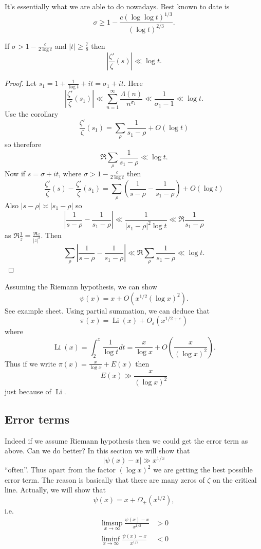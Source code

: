 \documentclass[a4paper]{article}
\theoremstyle{definition}
\begin{document}
It's essentially what we are able to do nowadays. Best known to date is
\[
  \sigma \geq 1 - \frac{c (\log \log t)^{1/3}}{(\log t)^{2/3}}.
\]

\begin{lemma}
  If \(\sigma > 1 - \frac{c}{2 \log t}\) and \(|t| \geq \frac{7}{8}\) then
  \[
    |\frac{\zeta'}{\zeta}(s)| \ll \log t.
  \]
\end{lemma}

\begin{proof}
  Let \(s_1 = 1 + \frac{1}{\log t} + it = \sigma_1 + it\). Here
  \[
    |\frac{\zeta'}{\zeta}(s_1)|
    \ll \sum_{n = 1}^\infty \frac{\Lambda(n)}{n^{\sigma_1}}
    \ll \frac{1}{\sigma_1 - 1}
    \ll \log t.
  \]
  Use the corollary
  \[
    \frac{\zeta'}{\zeta}(s_1) = \sum_\rho \frac{1}{s_1 - \rho} + O(\log t)
  \]
  so therefore
  \[
    \Re \sum_\rho \frac{1}{s_1 - \rho} \ll \log t.
  \]
  Now if \(s = \sigma + it\), where \(\sigma > 1 - \frac{c}{2 \log t}\) then
  \[
    \frac{\zeta'}{\zeta}(s) - \frac{\zeta'}{\zeta}(s_1)
    = \sum_\rho (\frac{1}{s - \rho} - \frac{1}{s_1 - \rho}) + O(\log t)
  \]
  Also \(|s - \rho| \asymp |s_1 - \rho|\) so
  \[
    |\frac{1}{s - \rho} - \frac{1}{s_1 - \rho}|
    \ll \frac{1}{|s_1 - \rho|^2 \log t}
    \ll \Re \frac{1}{s_1 - \rho}
  \]
  as \(\Re \frac{1}{z} = \frac{\Re z}{|z|^2}\). Then
  \[
    \sum_\rho |\frac{1}{s - \rho} - \frac{1}{s_1 - \rho}|
    \ll \Re \sum_\rho \frac{1}{s_1 - \rho}
    \ll \log t.
  \]
\end{proof}

Assuming the Riemann hypothesis, we can show
\[
  \psi(x) = x + O(x^{1/2} (\log x)^2).
\]
See example sheet. Using partial summation, we can deduce that
\[
  \pi(x) = \operatorname{Li} (x) + O_\varepsilon(x^{1/2 + \varepsilon})
\]
where
\[
  \operatorname{Li} (x)
  = \int_2^x \frac{1}{\log t} dt
  = \frac{x}{\log x} + O(\frac{x}{(\log x)^2}).
\]
Thus if we write \(\pi(x) = \frac{x}{\log x} + E(x)\) then
\[
  E(x) \gg \frac{x}{(\log x)^2}
\]
just because of \(\operatorname{Li}\).

\subsection{Error terms}

Indeed if we assume Riemann hypothesis then we could get the error term as above. Can we do better? In this section we will show that
\[
  |\psi(x) - x| \gg x^{1/x}
\]
``often''. Thus apart from the factor \((\log x)^2\) we are getting the best possible error term. The reason is basically that there are many zeros of \(\zeta\) on the critical line. Actually, we will show that
\[
  \psi(x) = x + \Omega_{\pm} (x^{1/2}),
\]
i.e.
\begin{align*}
  \limsup_{x \to \infty} \frac{\psi(x) - x}{x^{1/2}} &> 0 \\
  \liminf_{x \to \infty} \frac{\psi(x) - x}{x^{1/2}} &< 0
\end{align*}
\end{document}
